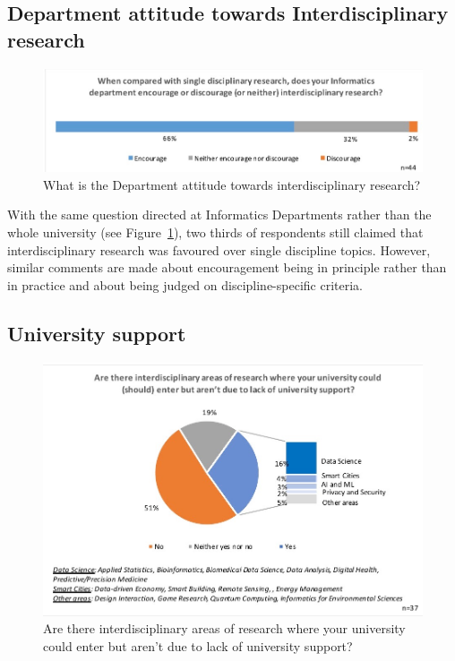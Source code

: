 \subsection{Department attitude towards Interdisciplinary research}


\begin{figure}[h]
\centering
\includegraphics[width = \linewidth]{charts/1b.jpg}
\caption{What is the Department attitude towards interdisciplinary research?}
\label{sect1:Dattitude}
\end{figure}

With the same question directed at Informatics Departments rather than the whole university (see Figure~\ref{sect1:Dattitude}), two thirds of respondents still claimed that interdisciplinary research was favoured over single discipline topics. However, similar comments are made about encouragement being in principle rather than in practice and about being judged on discipline-specific criteria.

\subsection{University support}

\begin{figure}[h]
\centering
\includegraphics[width = \linewidth]{charts/1c.jpg}
\caption{Are there interdisciplinary areas of research where your university
could enter but aren't due to lack of university support?}
\label{sect1:support}
\end{figure}

